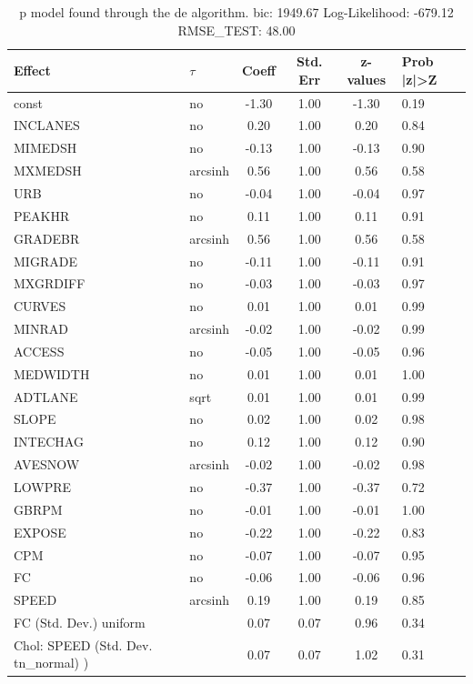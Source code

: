 \begin{table}
	\caption{p model found through the de algorithm. bic: 1949.67 Log-Likelihood: -679.12 RMSE_TEST: 48.00}
	\begin{center}
		\begin{tabular}{|l|l|c|c|c|l|}
			\hline
			Effect & $\tau$ & Coeff & Std. Err & z-values & Prob |z|>Z \\
			\hline
			const & no & -1.30 & 1.00 & -1.30 & 0.19 \\
			\hline
			INCLANES & no & 0.20 & 1.00 & 0.20 & 0.84 \\
			\hline
			MIMEDSH & no & -0.13 & 1.00 & -0.13 & 0.90 \\
			\hline
			MXMEDSH & arcsinh & 0.56 & 1.00 & 0.56 & 0.58 \\
			\hline
			URB & no & -0.04 & 1.00 & -0.04 & 0.97 \\
			\hline
			PEAKHR & no & 0.11 & 1.00 & 0.11 & 0.91 \\
			\hline
			GRADEBR & arcsinh & 0.56 & 1.00 & 0.56 & 0.58 \\
			\hline
			MIGRADE & no & -0.11 & 1.00 & -0.11 & 0.91 \\
			\hline
			MXGRDIFF & no & -0.03 & 1.00 & -0.03 & 0.97 \\
			\hline
			CURVES & no & 0.01 & 1.00 & 0.01 & 0.99 \\
			\hline
			MINRAD & arcsinh & -0.02 & 1.00 & -0.02 & 0.99 \\
			\hline
			ACCESS & no & -0.05 & 1.00 & -0.05 & 0.96 \\
			\hline
			MEDWIDTH & no & 0.01 & 1.00 & 0.01 & 1.00 \\
			\hline
			ADTLANE & sqrt & 0.01 & 1.00 & 0.01 & 0.99 \\
			\hline
			SLOPE & no & 0.02 & 1.00 & 0.02 & 0.98 \\
			\hline
			INTECHAG & no & 0.12 & 1.00 & 0.12 & 0.90 \\
			\hline
			AVESNOW & arcsinh & -0.02 & 1.00 & -0.02 & 0.98 \\
			\hline
			LOWPRE & no & -0.37 & 1.00 & -0.37 & 0.72 \\
			\hline
			GBRPM & no & -0.01 & 1.00 & -0.01 & 1.00 \\
			\hline
			EXPOSE & no & -0.22 & 1.00 & -0.22 & 0.83 \\
			\hline
			CPM & no & -0.07 & 1.00 & -0.07 & 0.95 \\
			\hline
			FC & no & -0.06 & 1.00 & -0.06 & 0.96 \\
			\hline
			SPEED & arcsinh & 0.19 & 1.00 & 0.19 & 0.85 \\
			\hline
			FC (Std. Dev.) uniform &  & 0.07 & 0.07 & 0.96 & 0.34 \\
			\hline
			 Chol: SPEED (Std. Dev. tn_normal) ) &  & 0.07 & 0.07 & 1.02 & 0.31 \\
			\hline
		\end{tabular}
	\end{center}
\end{table}